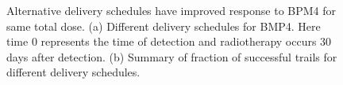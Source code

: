 \documentclass[
  default,
]{sn-jnl}
\begin{document}
\begin{figure}

\begin{minipage}{0.50\linewidth}


\subcaption{\label{fig-delivery_schedule}}

\end{minipage}%
%
\begin{minipage}{0.50\linewidth}


\subcaption{\label{fig-delivery_schedule_frac_succ}}

\end{minipage}%

\caption{\label{fig-delivery_schedule_frac_succ_overall}Alternative
delivery schedules have improved response to BPM4 for same total dose.
(a) Different delivery schedules for BMP4. Here time 0 represents the
time of detection and radiotherapy occurs 30 days after detection. (b)
Summary of fraction of successful trails for different delivery
schedules.}

\end{figure}%
\end{document}
